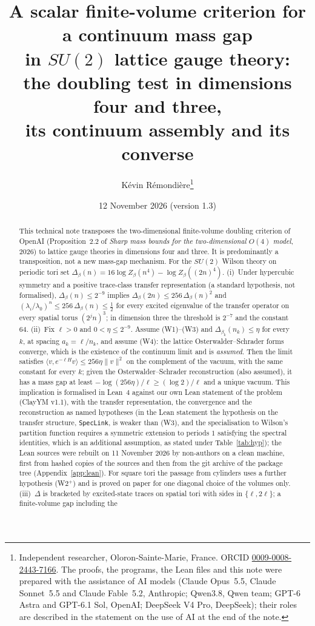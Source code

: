 \documentclass[11pt,a4paper]{article}
\title{A scalar finite-volume criterion for a continuum mass gap\\ in $SU(2)$ lattice gauge theory:\\ the doubling test in dimensions four and three,\\ its continuum assembly and its converse}
\author{K\'evin R\'emondi\`ere\thanks{Independent researcher, Oloron-Sainte-Marie, France. ORCID
\href{https://orcid.org/0009-0008-2443-7166}{0009-0008-2443-7166}. The proofs, the programs, the Lean files and this note were
prepared with the assistance of AI models (Claude Opus~5.5, Claude Sonnet~5.5 and Claude Fable~5.2, Anthropic; Qwen3.8, Qwen team; GPT-6 Astra and GPT-6.1 Sol, OpenAI; DeepSeek V4 Pro, DeepSeek); their roles are described in the
statement on the use of AI at the end of the note.}}
\date{12 November 2026 (version 1.3)}
\theoremstyle{plain}
\theoremstyle{definition}
\theoremstyle{remark}
\numberwithin{equation}{section}
\begin{document}
\maketitle

\begin{abstract}
This technical note transposes the two-dimensional finite-volume doubling criterion of OpenAI (Proposition~2.2 of \emph{Sharp mass bounds
for the two-dimensional $O(4)$ model}, 2026) to lattice gauge theories in dimensions four and three. It is predominantly a transposition,
not a new mass-gap mechanism. For the $SU(2)$ Wilson theory on periodic tori set
$\Delta_\beta(n)=16\log Z_\beta(n^4)-\log Z_\beta((2n)^4)$.
(i)~Under hypercubic symmetry and a positive trace-class transfer representation (a standard hypothesis, not formalised),
$\Delta_\beta(n)\le2^{-9}$ implies $\Delta_\beta(2n)\le256\,\Delta_\beta(n)^2$ and
$(\lambda_i/\lambda_0)^n\le256\,\Delta_\beta(n)\le\frac12$ for every excited eigenvalue of the transfer operator on every spatial torus
$(2^jn)^3$; in dimension three the threshold is $2^{-7}$ and the constant $64$.
(ii)~Fix $\ell>0$ and $0<\eta\le2^{-9}$. Assume (W1)--(W3) and $\Delta_{\beta_k}(n_k)\le\eta$ for every $k$, at spacing $a_k=\ell/n_k$, and assume (W4): the lattice
Osterwalder--Schrader forms converge, which is the existence of the continuum limit and is \emph{assumed}. Then the limit satisfies
$\langle v,e^{-\ell H}v\rangle\le256\eta\|v\|^2$ on the complement of the vacuum, with the same constant for every $k$; given the
Osterwalder--Schrader reconstruction (also assumed), it has a mass gap at least $-\log(256\eta)/\ell\ge(\log2)/\ell$ and a unique vacuum.
This implication is formalised in Lean~4 against our own Lean statement of the problem (ClayYM v1.1), with the transfer representation, the
convergence and the reconstruction as named hypotheses (in the Lean statement the hypothesis on the transfer structure, \texttt{SpecLink}, is weaker than (W3), and the specialisation to Wilson's partition function requires a symmetric extension to periods $1$ satisfying the spectral identities, which is an additional assumption, as stated under Table~\ref{tab:hyp}); the Lean sources were rebuilt on 11 November 2026 by non-authors on a clean
machine, first from hashed copies of the sources and then from the git archive of the package tree (Appendix~\ref{app:lean}). For square tori the passage from cylinders uses a further hypothesis (W2$^+$) and is proved on paper for one
diagonal choice of the volumes only.
(iii)~$\Delta$ is bracketed by excited-state traces on spatial tori with sides in $\{\ell,2\ell\}$; a finite-volume gap including the

\end{abstract}
\end{document}

